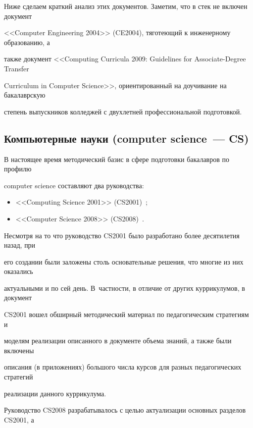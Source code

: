 Ниже сделаем краткий анализ этих документов. Заметим, что в стек не включен документ 

<<Computer Engineering 2004>> (CE2004), тяготеющий к инженерному образованию, а 

также документ <<Computing Curricula 2009: Guidelines for Associate-Degree Transfer 

Curriculum in Computer Science>>, ориентированный на доучивание на бакалаврскую 

степень выпускников колледжей с двухлетней профессиональной подготовкой.



\subsection{Компьютерные науки (computer science~--- CS)}

   

   В настоящее время методический базис в сфере подготовки бакалавров по профилю 

computer science составляют два руководства:

   \begin{itemize}

\item <<Computing Science 2001>> (CS2001)~\cite{8-s}; 

\item <<Computer Science 2008>> (CS2008)~\cite{16-s}.

\end{itemize}



Несмотря на то что руководство CS2001 было разработано более десятилетия назад, при 

его создании были заложены столь основательные решения, что многие из них оказались 

актуальными и по сей день. В~част\-ности, в отличие от других куррикулумов, в документ 

CS2001 вошел обширный методический материал по педагогическим стратегиям и 

моделям реализации описанного в документе объема знаний, а также были включены 

описания (в приложениях) большого числа курсов для разных педагогических стратегий 

реализации данного куррикулума.



Руководство CS2008 разрабатывалось с целью актуализации основных разделов CS2001, а 

